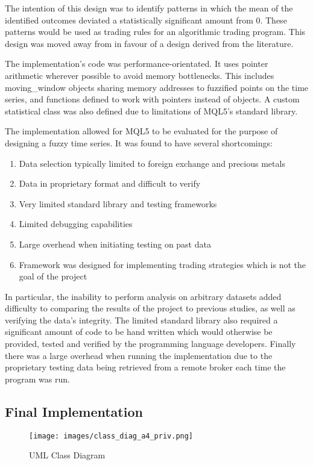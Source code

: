 \documentclass{article}
\theoremstyle{definition}
\begin{document}
The intention of this design was to identify patterns in which the mean of the identified outcomes deviated a statistically significant amount from 0. These patterns would be used as trading rules for an algorithmic trading program. This design was moved away from in favour of a design derived from the literature.

The implementation's code was performance-orientated. It uses pointer arithmetic wherever possible to avoid memory bottlenecks. This includes moving\_window objects sharing memory addresses to fuzzified points on the time series, and functions defined to work with pointers instead of objects. A custom statistical class was also defined due to limitations of MQL5's standard library.

The implementation allowed for MQL5 to be evaluated for the purpose of designing a fuzzy time series. It was found to have several shortcomings:

\begin{enumerate}[label=\roman*]
\item Data selection typically limited to foreign exchange and precious metals
\item Data in proprietary format and difficult to verify
\item Very limited standard library and testing frameworks
\item Limited debugging capabilities
\item Large overhead when initiating testing on past data
\item Framework was designed for implementing trading strategies which is not the goal of the project
\end{enumerate}

In particular, the inability to perform analysis on arbitrary datasets added difficulty to comparing the results of the project to previous studies, as well as verifying the data's integrity. The limited standard library also required a significant amount of code to be hand written which would otherwise be provided, tested and verified by the programming language developers. Finally there was a large overhead when running the implementation due to the proprietary testing data being retrieved from a remote broker each time the program was run.

\subsection{Final Implementation}

\begin{figure}[H]
    \centering
    \texttt{[image: images/class\_diag\_a4\_priv.png]}
    \caption{UML Class Diagram}
    \label{uml}
\end{figure}
\end{document}
